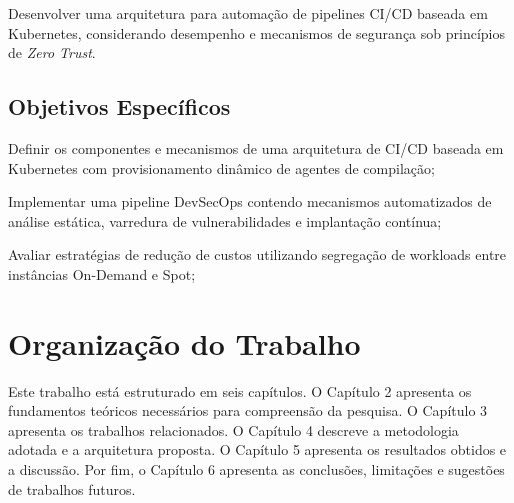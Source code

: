 Desenvolver uma arquitetura para automação de pipelines CI/CD baseada em Kubernetes, considerando desempenho e mecanismos de segurança sob princípios de \textit{Zero Trust}.

\subsection{Objetivos Específicos}
\label{sec:objetivos-especificos}

\begin{alineas}
    \item Definir os componentes e mecanismos de uma arquitetura de CI/CD baseada em Kubernetes com provisionamento dinâmico de agentes de compilação;
    \item Implementar uma pipeline DevSecOps contendo mecanismos automatizados de análise estática, varredura de vulnerabilidades e implantação contínua;
    \item Avaliar estratégias de redução de custos utilizando segregação de workloads entre instâncias On-Demand e Spot;
\end{alineas}

\section{Organização do Trabalho}
\label{sec:organizacao-trabalho}

Este trabalho está estruturado em seis capítulos. O Capítulo 2 apresenta os fundamentos teóricos necessários para compreensão da pesquisa. O Capítulo 3 apresenta os trabalhos relacionados. O Capítulo 4 descreve a metodologia adotada e a arquitetura proposta. O Capítulo 5 apresenta os resultados obtidos e a discussão. Por fim, o Capítulo 6 apresenta as conclusões, limitações e sugestões de trabalhos futuros.

